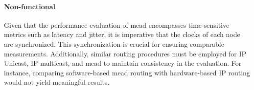 \paragraph{Non-functional} %
\label{par:Non-functional}
Given that the performance evaluation of \gls{mead} encompasses time-sensitive
    metrics such as latency and jitter, it is imperative that the clocks of
    each node are synchronized.
This synchronization is crucial for ensuring comparable measurements.
Additionally, similar routing procedures must be employed for IP Unicast, IP
    multicast, and \gls{mead} to maintain consistency in the evaluation.
For instance, comparing software-based \gls{mead} routing with hardware-based IP
    routing would not yield meaningful results.



